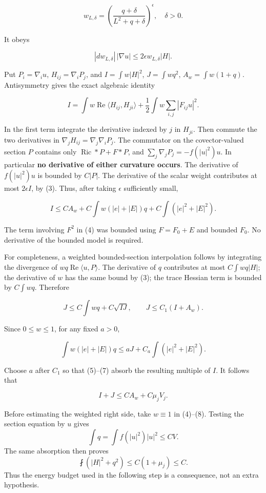 \documentclass[11pt]{article}
\begin{document}
\[
 w_{L,\delta}=\left(\frac{q+\delta}{L^2+q+\delta}\right)^\epsilon,
 \quad \delta>0.
\]

It obeys

\[
 |dw_{L,\delta}|\,|\nabla u|\le2\epsilon w_{L,\delta}|H|.
\tag{3}
\]

Put \(P_i=\nabla_i u\), \(H_{ij}=\nabla_iP_j\), and \(I=\int w|H|^2\),
\(J=\int wq^2\), \(A_w=\int w(1+q)\). Antisymmetry gives the exact
algebraic identity

\[
 I=\int w\operatorname{Re}\langle H_{ij},H_{ji}\rangle
       +\frac12\int w\sum_{i,j}|F_{ij}u|^2.
\tag{4}
\]

In the first term integrate the derivative indexed by \(j\) in
\(H_{ji}\). Then commute the two derivatives in
\(\nabla_jH_{ij}=\nabla_j\nabla_iP_j\). The commutator on the
covector-valued section \(P\) contains only
\(\operatorname{Ric}*P+F*P\), and \(\sum_j\nabla_jP_j=-f(|u|^2)u\). In
particular \textbf{no derivative of either curvature occurs}. The
derivative of \(f(|u|^2)u\) is bounded by \(C|P|\). The derivative of
the scalar weight contributes at most \(2\epsilon I\), by (3). Thus,
after taking \(\epsilon\) sufficiently small,

\[
 I\le C A_w+C\int w(|e|+|E|)q+C\int (|e|^2+|E|^2).
\tag{5}
\]

The term involving \(F^2\) in (4) was bounded using \(F=F_0+E\) and
bounded \(F_0\). No derivative of the bounded model is required.

For completeness, a weighted bounded-section interpolation follows by
integrating the divergence of \(wq\operatorname{Re}\langle u,P\rangle\).
The derivative of \(q\) contributes at most \(C\int wq|H|\); the
derivative of \(w\) has the same bound by (3); the trace Hessian term is
bounded by \(C\int wq\). Therefore

\[
 J\le C\int wq+C\sqrt{IJ},\qquad
 J\le C_1(I+A_w).\tag{6}
\]

Since \(0\le w\le1\), for any fixed \(a>0\),

\[
 \int w(|e|+|E|)q
 \le aJ+C_a\int(|e|^2+|E|^2).
\tag{7}
\]

Choose \(a\) after \(C_1\) so that (5)--(7) absorb the resulting
multiple of \(I\). It follows that

\[
 I+J\le C A_w+C\mu_jV_j.
\tag{8}
\]

Before estimating the weighted right side, take \(w\equiv1\) in
(4)--(8). Testing the section equation by \(u\) gives \[
\int q=\int f(|u|^2)|u|^2\le CV.
\] The same absorption then proves \[
\fint(|H|^2+q^2)\le C(1+\mu_j)\le C.
\] Thus the energy budget used in the following step is a consequence,
not an extra hypothesis.
\end{document}
